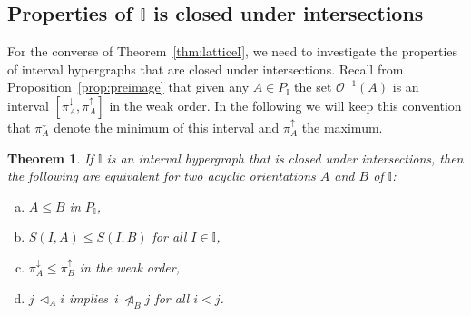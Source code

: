 \documentclass[reqno]{amsart}
\newtheorem{theorem}{Theorem}[section]
\theoremstyle{definition}
\newcommand{\less}{\vartriangleleft} %
\newcommand{\projDown}{\pi^\downarrow} %
\newcommand{\projUp}{\pi^\uparrow} %
\newcommand{\Or}{\mathcal O}  %
\newcommand{\II}{\mathbb I} %
\begin{document}

\subsection{Properties of $\II$ is closed under intersections}  
\label{subsec:IntClosedI}

For the converse of Theorem~\ref{thm:latticeI}, we need to investigate the properties of interval hypergraphs that are closed under intersections.
Recall from Proposition~\ref{prop:preimage} that given any $A\in P_\II$ the set $\Or^{-1}(A)$ is an interval $[\projDown_A,\projUp_A]$ in the weak order.
In the following we will keep this convention that $\projDown_A$ denote the minimum of this interval and $\projUp_A$ the maximum.

\begin{theorem}\label{thm:propertieofintI}
If $\II$ is an interval  hypergraph that is closed under intersections, then the following are equivalent for two acyclic orientations $A$ and $B$ of $\II$:
\begin{enumerate}[(a)]
	\item $A\le B$ in $P_\II$,
	\item $S(I,A)\le S(I,B)$ for all $I\in\II$,
	\item $\projDown_A \le \projUp_B$ in the weak order,
	\item $j\,\less_A i$ implies~$i \,\not\less_B j$ for all $i<j$.
\end{enumerate}
\end{theorem}
\end{document}
